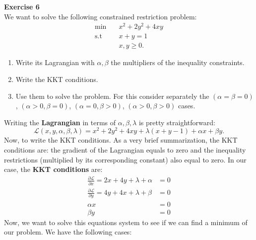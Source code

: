 \documentclass[11pt,table]{article}
\newenvironment{problem}[2][Exercise]
{ \begin{mdframed}[backgroundcolor=gray!20] \textbf{#1 #2} \\}
	{  \end{mdframed}}
\begin{document}
\begin{problem}{6}
We want to solve the following constrained restriction problem:
\begin{align*}
	\min \quad       & x^{2} + 2y^{2} + 4xy \\
	\text{s.t} \quad & x + y = 1            \\
	                 & x,y \geq 0.
\end{align*}
\begin{enumerate}
	\item Write its Lagrangian with \(\alpha,\beta\) the multipliers of the inequality constraints.
	\item Write the KKT conditions.
	\item Use them to solve the problem. For this consider separately the \((\alpha = \beta = 0)\), \((\alpha > 0, \beta = 0)\), \((\alpha = 0, \beta > 0)\), \((\alpha > 0, \beta > 0)\) cases.
\end{enumerate}
\end{problem}

Writing the \textbf{Lagrangian} in terms of \(\alpha,\beta,\lambda\) is pretty straightforward:
\[
	\mathcal L(x,y,\alpha,\beta,\lambda) = x^{2} + 2y^{2} + 4xy + \lambda(x+y - 1) + \alpha x + \beta y .
\]
Now, to write the KKT conditions. As a very brief summarization, the KKT conditions are: the gradient of the Lagrangian equals to zero and the inequality restrictions (multiplied by its corresponding constant) also equal to zero. In our case, the \textbf{KKT conditions} are:
\begin{align*}
	\frac{\partial \mathcal L}{\partial x}  = 2x + 4y + \lambda + \alpha & = 0 \\
	\frac{\partial \mathcal L}{\partial y}  = 4y + 4x + \lambda + \beta  & = 0 \\
	\alpha x                                                             & = 0 \\
	\beta y                                                              & = 0
\end{align*}
Now, we want to solve this equations system to see if we can find a minimum of our problem. We have the following cases:
\end{document}
